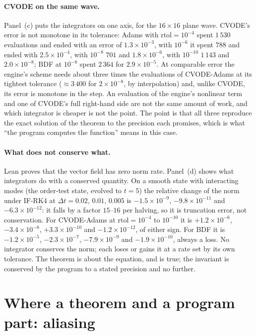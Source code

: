 \paragraph{CVODE on the same wave.} Panel~(c) puts the integrators on one axis, for the $16\times16$ plane wave. CVODE's error is not monotone in its tolerance: Adams with $\mathrm{rtol}=10^{-4}$ spent $1\,530$ evaluations and ended with an error of $1.3\times10^{-3}$, with $10^{-6}$ it spent $788$ and ended with
$2.5\times10^{-4}$, with $10^{-8}$ $701$ and $1.8\times10^{-6}$, with $10^{-10}$ $1\,143$ and $2.0\times10^{-8}$; BDF at $10^{-8}$ spent $2\,364$ for $2.9\times10^{-5}$. At comparable error the engine's scheme needs about three times the
evaluations of CVODE-Adams at its tightest tolerance ($\approx3\,400$ for $2\times10^{-8}$, by interpolation) and, unlike CVODE, its error is monotone in the step. An evaluation of the engine's nonlinear term and one of CVODE's full right-hand side are not the same amount of work, and which integrator is cheaper is not the
point. The point is that all three reproduce the exact solution of the theorem to the precision each promises, which is what ``the program computes the function'' means in this case.

\paragraph{What does not conserve what.} Lean proves that the vector field has zero norm rate. Panel~(d) shows what integrators do with a conserved quantity. On a smooth state with interacting modes (the order-test state, evolved to $t=5$) the relative change of the norm under IF-RK4 at $\Delta t=0.02$, $0.01$, $0.005$ is
$-1.5\times10^{-9}$, $-9.8\times10^{-11}$ and $-6.3\times10^{-12}$: it falls by a factor $15$--$16$ per halving, so it is truncation error, not conservation. For CVODE-Adams at $\mathrm{rtol}=10^{-4}$ to $10^{-10}$ it is $+1.2\times10^{-6}$, $-3.4\times10^{-8}$,
$+3.3\times10^{-10}$ and $-1.2\times10^{-12}$, of either sign. For BDF it is $-1.2\times10^{-5}$, $-2.3\times10^{-7}$, $-7.9\times10^{-9}$ and $-1.9\times10^{-10}$, always a loss. No integrator conserves the norm; each
loses or gains it at a rate set by its own tolerance. The theorem is about the equation, and is true; the invariant is conserved by the program to a stated precision and no further.

\section{Where a theorem and a program part: aliasing}\label{ch02:alias}

